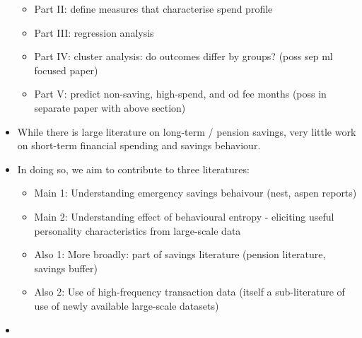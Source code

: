 \begin{itemize}
\begin{itemize}
            \item Part II: define measures that characterise spend profile

            \item Part III: regression analysis

            \item Part IV: cluster analysis: do outcomes differ by groups? (poss sep ml
                focused paper)

            \item Part V: predict non-saving, high-spend, and od fee months (poss in
                separate paper with above section)

        \end{itemize}


    \item While there is large literature on long-term / pension savings, very
        little work on short-term financial spending and savings behaviour.

    \item In doing so, we aim to contribute to three literatures:

    \begin{itemize}

        \item Main 1: Understanding emergency savings behaivour (nest, aspen reports)

        \item Main 2: Understanding effect of behavioural entropy - eliciting
            useful personality characteristics from large-scale data

        \item Also 1: More broadly: part of savings literature (pension literature,
            savings buffer)

        \item Also 2: Use of high-frequency transaction data (itself a sub-literature of
            use of newly available large-scale datasets)
    \end{itemize}
    \item
\end{itemize}






